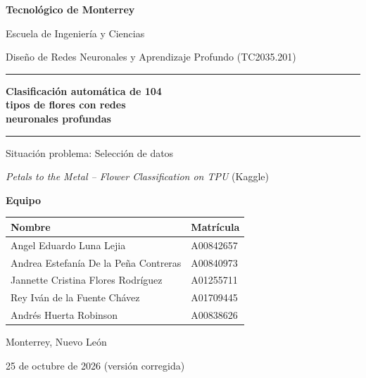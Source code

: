 \begin{titlepage}
\centering
\vspace*{1cm}
{\large\bfseries Tecnológico de Monterrey\par}
\vspace{0.2cm}
{Escuela de Ingeniería y Ciencias\par}
\vspace{0.1cm}
{\small Diseño de Redes Neuronales y Aprendizaje Profundo (TC2035.201)\par}

\vspace{3cm}
\rule{\textwidth}{0.8pt}\par
\vspace{0.6cm}
{\LARGE\bfseries Clasificación automática de 104\\ tipos de flores con redes\\ neuronales profundas\par}
\vspace{0.6cm}
\rule{\textwidth}{0.8pt}\par

\vspace{1cm}
{\large Situación problema: Selección de datos\par}
\vspace{0.2cm}
{\textit{Petals to the Metal -- Flower Classification on TPU} (Kaggle)\par}

\vspace{2.5cm}
{\bfseries Equipo\par}
\vspace{0.3cm}
\begin{tabular}{ll}
\toprule
Nombre & Matrícula \\
\midrule
Angel Eduardo Luna Lejia & A00842657 \\
Andrea Estefanía De la Peña Contreras & A00840973 \\
Jannette Cristina Flores Rodríguez & A01255711 \\
Rey Iván de la Fuente Chávez & A01709445 \\
Andrés Huerta Robinson & A00838626 \\
\bottomrule
\end{tabular}

\vfill
{Monterrey, Nuevo León\par}
{25 de octubre de 2026 (versión corregida)\par}
\end{titlepage}
